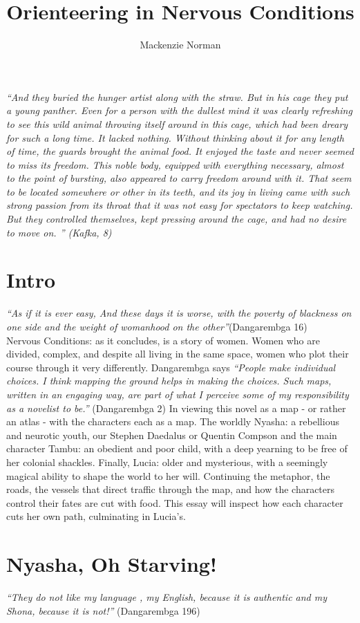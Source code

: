 \documentclass{article}
\title{Orienteering in Nervous Conditions}
\author{Mackenzie Norman}
\begin{document}
\maketitle
\textit{``And they buried the hunger artist along with the straw. But in his cage they put a young panther. Even for a person with the dullest mind it was clearly refreshing to see this wild animal throwing itself around in this cage, which had been dreary for such a long time. It lacked nothing. Without thinking about it for any length of time, the guards brought the animal food. It enjoyed the taste and never seemed to miss its freedom. This noble body, equipped with everything necessary, almost to the point of bursting, also appeared to carry freedom around with it. That seem to be located somewhere or other in its teeth, and its joy in living came with such strong passion from its throat that it was not easy for spectators to keep watching. But they controlled themselves, kept pressing around the cage, and had no desire to move on. '' (Kafka, 8)}
\section*{Intro}

\textit{``As if it is ever easy, And these days it is worse, with the poverty of blackness on one side and the weight of womanhood on the other''}(Dangarembga 16)\\ Nervous Conditions: as it concludes, is a story of women. Women who are divided, complex, and despite all living in the same space, women who plot their course through it  very differently. Dangarembga says \textit{``People make individual choices. I think mapping the ground helps in making the choices. Such maps, written in an engaging way, are part of what I perceive some of my responsibility as a novelist to be.''} (Dangarembga 2) In viewing this novel as a map - or rather an atlas - with the characters each as a map. The worldly Nyasha: a rebellious and neurotic youth, our Stephen Daedalus or Quentin Compson and the main character Tambu: an obedient and poor child, with a deep yearning to be free of her colonial shackles.  Finally, Lucia: older and mysterious, with a seemingly magical ability to shape the world to her will. Continuing the metaphor, the roads, the vessels that direct traffic through the map, and how the characters control their fates are cut with food. This essay will inspect how each character cuts her own path, culminating in Lucia's. 


\section*{Nyasha, Oh Starving!}
\textit{``They do not like my language , my English, because it is authentic and my Shona, because it is not!'' }(Dangarembga 196)
\end{document}
